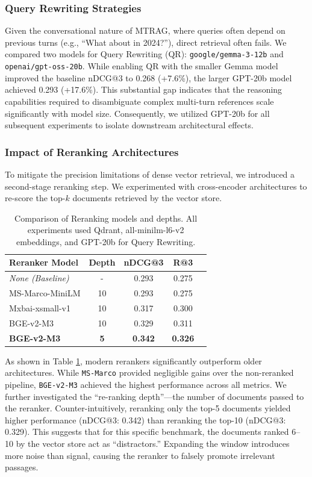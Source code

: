 \documentclass[11pt]{article}
\begin{document}
\subsubsection{Query Rewriting Strategies}
Given the conversational nature of MTRAG, where queries often depend on previous turns (e.g., ``What about in 2024?''), direct retrieval often fails. We compared two models for Query Rewriting (QR): \texttt{google/gemma-3-12b} and \texttt{openai/gpt-oss-20b}.
While enabling QR with the smaller Gemma model improved the baseline nDCG@3 to 0.268 (+7.6\%), the larger GPT-20b model achieved 0.293 (+17.6\%). This substantial gap indicates that the reasoning capabilities required to disambiguate complex multi-turn references scale significantly with model size. Consequently, we utilized GPT-20b for all subsequent experiments to isolate downstream architectural effects.

\subsubsection{Impact of Reranking Architectures}
To mitigate the precision limitations of dense vector retrieval, we introduced a second-stage reranking step. We experimented with cross-encoder architectures to re-score the top-$k$ documents retrieved by the vector store.

\begin{table}[h]
\centering
\small
\begin{tabular}{lcccc}
\hline
\textbf{Reranker Model} & \textbf{Depth} & \textbf{nDCG@3} & \textbf{R@3} \\
\hline
\textit{None (Baseline)} & - & 0.293 & 0.275 \\
MS-Marco-MiniLM & 10 & 0.293 & 0.275 \\
Mxbai-xsmall-v1 & 10 & 0.317 & 0.300 \\
BGE-v2-M3 & 10 & 0.329 & 0.311 \\
\textbf{BGE-v2-M3} & \textbf{5} & \textbf{0.342} & \textbf{0.326} \\
\hline
\end{tabular}
\caption{Comparison of Reranking models and depths. All experiments used Qdrant, all-minilm-l6-v2 embeddings, and GPT-20b for Query Rewriting.}
\label{tab:rerankers}
\end{table}

As shown in Table \ref{tab:rerankers}, modern rerankers significantly outperform older architectures. While \texttt{MS-Marco} provided negligible gains over the non-reranked pipeline, \texttt{BGE-v2-M3} achieved the highest performance across all metrics. We further investigated the ``re-ranking depth''---the number of documents passed to the reranker. Counter-intuitively, reranking only the top-5 documents yielded higher performance (nDCG@3: 0.342) than reranking the top-10 (nDCG@3: 0.329). This suggests that for this specific benchmark, the documents ranked 6--10 by the vector store act as ``distractors.'' Expanding the window introduces more noise than signal, causing the reranker to falsely promote irrelevant passages.
\end{document}
